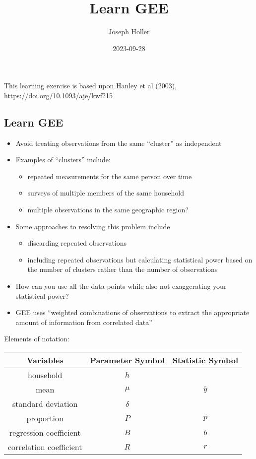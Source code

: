 \documentclass[
]{article}
\title{Learn GEE}
\author{Joseph Holler}
\date{2023-09-28}
\providecommand{\tightlist}{%
  \setlength{\itemsep}{0pt}\setlength{\parskip}{0pt}}
\begin{document}
\maketitle

This learning exercise is based upon Hanley et al (2003),
\url{https://doi.org/10.1093/aje/kwf215}

\hypertarget{learn-gee}{%
\subsection{Learn GEE}\label{learn-gee}}

\begin{itemize}
\tightlist
\item
  Avoid treating observations from the same ``cluster'' as independent
\item
  Examples of ``clusters'' include:

  \begin{itemize}
  \tightlist
  \item
    repeated measurements for the same person over time
  \item
    surveys of multiple members of the same household
  \item
    multiple observations in the same geographic region?
  \end{itemize}
\item
  Some approaches to resolving this problem include

  \begin{itemize}
  \tightlist
  \item
    discarding repeated observations
  \item
    including repeated observations but calculating statistical power
    based on the number of clusters rather than the number of
    observations
  \end{itemize}
\item
  How can you use all the data points while also not exaggerating your
  statistical power?
\item
  GEE uses ``weighted combinations of observations to extract the
  appropriate amount of information from correlated data''
\end{itemize}

Elements of notation:

\begin{longtable}[]{@{}ccc@{}}
\toprule\noalign{}
Variables & Parameter Symbol & Statistic Symbol \\
\midrule\noalign{}
\endhead
\bottomrule\noalign{}
\endlastfoot
household & \(h\) & \\
mean & \(\mu\) & \(\overline{y}\) \\
standard deviation & \(\delta\) & \\
proportion & \(P\) & \(p\) \\
regression coefficient & \(B\) & \(b\) \\
correlation coefficient & \(R\) & \(r\) \\
\end{longtable}
\end{document}

